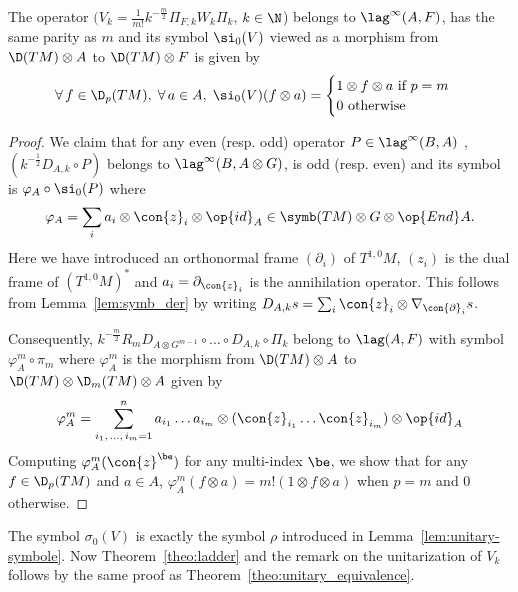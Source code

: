 \begin{lemm}
The operator $(V_k = \frac{1}{m!} k^{-\frac{m}{2}} \Pi_{F,k} W_k \Pi_{k}$, $k \in \N$) belongs to $ \lag ^{\infty} (A, F)$, has the same parity as $m$ and its symbol $\si_0(V)$ viewed as a morphism from $\D(TM) \otimes A$ to $\D(TM) \otimes F$ is given by
\[
\forall \, f \in \D_p(TM), \; \forall \, a \in A, \; \si_0(V) (f \otimes a)
=
\begin{cases} 1 \otimes f \otimes a \text{ if $p = m $} \\ 0 \text{
otherwise}
\end{cases}
\]
\end{lemm}

\begin{proof}
We claim that for any even (resp. odd) operator 
$P \in \lag^{\infty} (B, A)$ , \newline $(k^{-\frac{1}{2}}D_{A,k} \circ P)$ belongs to $\lag^{\infty} (B, A
\otimes G) $, is odd (resp. even) and its symbol is $\varphi_A \circ \si_0 (P)$ where
\[
\varphi_A = \sum_ i a_i \otimes \con{z}_i \otimes
\op{id}_A \in \symb (TM) \otimes G \otimes \op{End} A.
\]
Here we have introduced an orthonormal frame $(
\partial_i)$ of $T^{1,0}M$, $(z_i)$ is the dual frame of $(T^{1,0}M)^*$ and $a_i =\partial_{\con{z}_i}$ is the annihilation operator.  This follows from Lemma~\ref{lem:symb_der} by writing $D_{A,k} s = \sum_i \con{z}_i \otimes
\nabla_{\con{\partial}_i} s$. 

Consequently, $k^{-\frac{m}{2}}R_m D_{A \otimes G^{m-1}} \circ \ldots \circ D_{A,k} \circ \Pi_k $ belong to $\lag (A, F)$ with symbol $\varphi_{A}^m \circ \pi_m$ where $\varphi_A^m $ is the morphism from $\D (TM) \otimes A$ to $\D (TM) \otimes \D_m (TM) \otimes A$ given by
\[
\varphi_A^m = \sum_{i_1, \,\ldots,\, i_m =1}^{n} a_{i_1} \ldots a_{i_m} \otimes
(\con{z}_{i_1} \ldots \con{z}_{i_m}) \otimes \op{id}_A
\]
Computing $\varphi_A^m (\con{z}^{\be})$ for any multi-index $\be$, we show that for any $f \in \D_p(TM)$ and $ a\in A$, $ \varphi_A^m (f
\otimes a) = m ! (1 \otimes f \otimes a)$ when $p=m$ and $0$ otherwise.
\end{proof}

The symbol $\sigma_0 (V)$ is exactly the symbol $\rho$ introduced in Lemma~\ref{lem:unitary-symbole}. Now Theorem~\ref{theo:ladder} and the remark on the unitarization of $V_k$ follows by the same proof as Theorem~\ref{theo:unitary_equivalence}.

\appendix
\section{} \label{sec:appendix}

